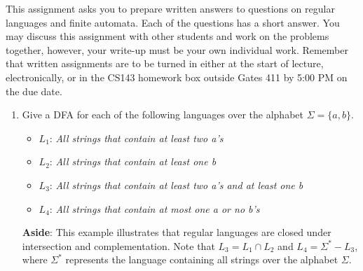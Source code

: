 \documentclass[11pt]{article}
\begin{document}

This assignment asks you to prepare written answers to questions on regular
languages and finite automata. Each of the questions has a short answer. You
may discuss this assignment with other students and work on the problems
together, however, your write-up must be your own individual work.  Remember
that written assignments are to be turned in either at the start of lecture, 
electronically, or in the CS143 homework box outside Gates 411 by 5:00 PM on the due date.

\bigskip

\begin{enumerate}
	\item 
	Give a DFA for each of the following languages over the alphabet $\Sigma = \{a,b\}$. 
	\begin{itemize}
		\item $L_1$: \emph{All strings that contain at least two a's} 
		\item $L_2$: \emph{All strings that contain at least one b} 
		\item $L_3$: \emph{All strings that contain at least two a's and at least one b} 
		\item $L_4$: \emph{All strings that contain at most one a or no b's} 
	\end{itemize}
	
	{\bf Aside}: This example illustrates that regular
	languages are closed under intersection and complementation. Note that
	$L_3 = L_1 \cap L_2$ and $L_4 = \Sigma^{*} - L_3$, where $\Sigma^{*}$
	represents the language containing all strings over the alphabet $\Sigma$. 
	

\end{enumerate}
\end{document}

